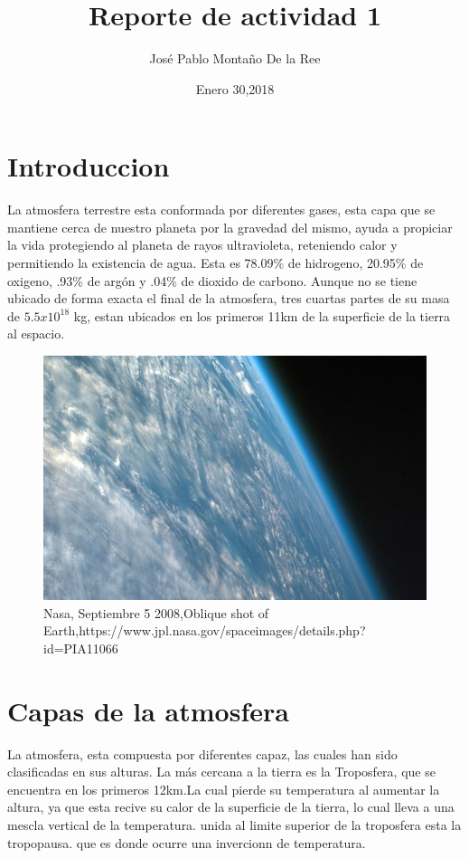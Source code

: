 \documentclass{article}
\title{
Reporte de actividad 1}
\author{José Pablo Montaño De la Ree}
\date{Enero 30,2018}
\begin{document}
\maketitle


\section{Introduccion}

La atmosfera terrestre esta conformada por diferentes gases, esta capa que se mantiene cerca de nuestro planeta por la gravedad del mismo, ayuda a propiciar la vida protegiendo al planeta de rayos ultravioleta, reteniendo calor y permitiendo la existencia de agua. Esta es 78.09\% de hidrogeno, 20.95\% de oxigeno, .93\% de argón y .04\% de dioxido de carbono. Aunque no se tiene ubicado de forma exacta el final de la atmosfera, tres cuartas partes de su masa de  $5.5x10^{18}$ kg, estan ubicados en los primeros 11km de la superficie de la tierra al espacio.

\begin{figure}[h!]
  \includegraphics[width=\linewidth]{atmosphere.jpg}
  \caption{Nasa, Septiembre 5 2008,Oblique shot of Earth,https://www.jpl.nasa.gov/spaceimages/details.php?id=PIA11066}
  \end{figure}

\section{Capas de la atmosfera}

La atmosfera, esta compuesta por diferentes capaz, las cuales han sido clasificadas en sus alturas. La más cercana a la tierra es la Troposfera, que se encuentra en los primeros 12km.La cual pierde su temperatura al aumentar la altura, ya que esta recive su calor de la superficie de la tierra, lo cual lleva a una mescla vertical de la temperatura. unida al limite superior de la troposfera esta la tropopausa. que es donde ocurre una invercionn de temperatura.
\linebreak
\end{document}
